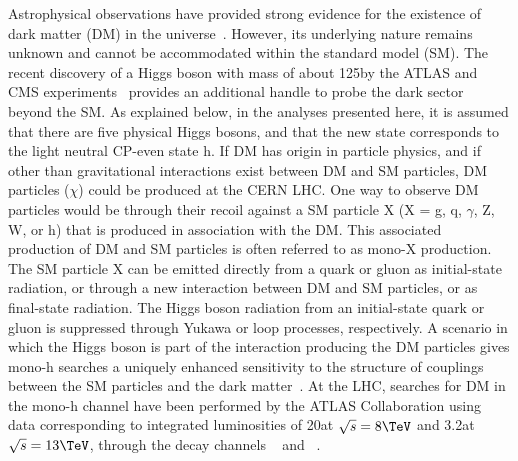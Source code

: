 Astrophysical observations have provided strong evidence for the existence of 
dark matter (DM) in the universe~\cite{FNAL_Review}.
However, its underlying nature remains unknown and cannot be accommodated 
within the standard model (SM). The recent discovery of a Higgs boson with 
mass of about 125\GeV by the ATLAS and CMS 
experiments~\cite{HiggsObs_ATLAS, HiggsObs_CMS, HiggsObs_CMS_Long}
provides an additional handle to probe the dark sector beyond the SM.  
As explained below, in the analyses presented here, it is assumed that there 
are five physical Higgs bosons, and that the new state corresponds to the 
light neutral CP-even state h.
If DM has origin in particle physics, and if other than gravitational 
interactions exist between DM and SM particles, DM particles ($\chi$) could be 
produced at the CERN LHC. 
One way to observe DM particles would be through their recoil against a SM 
particle X (X = g, q, $\gamma$, Z, W, or h) that is produced in association 
with the DM. 
This associated production of DM and SM particles is often referred to as 
mono-X production. The SM particle X can be emitted directly from a quark or 
gluon as initial-state 
radiation, or through a new interaction between DM and SM 
particles, or as final-state radiation. 
The Higgs boson radiation from an initial-state quark or gluon is suppressed 
through Yukawa or loop processes, respectively. 
A scenario in which the Higgs boson is part of the interaction producing the 
DM particles gives mono-h searches a uniquely enhanced 
sensitivity to the structure of couplings between the SM particles and the 
dark matter~\cite{monoHiggs3,monoHiggs1,2HDM}.
At the LHC, searches for DM in the mono-h channel have been performed 
by the ATLAS Collaboration using data  corresponding to integrated 
luminosities of 20\fbinv at $\sqrt{s}=8\TeV$ and 
3.2\fbinv at $\sqrt{s}=13\TeV$, through the decay channels 
\Hbb~\cite{ATLASHBB,ATLAS-2015-PAS} and \HGG~\cite{ATLASHAA}. 

